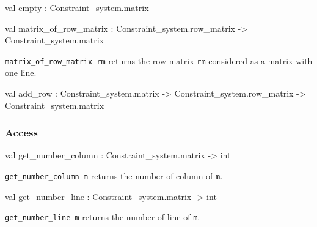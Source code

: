 \begin{ocamldocsigend}


\label{val:Constraint-underscoresystem.Matrix.empty}\begin{ocamldoccode}
val empty : Constraint_system.matrix
\end{ocamldoccode}


\label{val:Constraint-underscoresystem.Matrix.matrix-underscoreof-underscorerow-underscorematrix}\begin{ocamldoccode}
val matrix_of_row_matrix :
  Constraint_system.row_matrix -> Constraint_system.matrix
\end{ocamldoccode}
\begin{ocamldocdescription}
{\tt{matrix\_of\_row\_matrix rm}} returns the row matrix {\tt{rm}} considered as a matrix with one line.


\end{ocamldocdescription}


\label{val:Constraint-underscoresystem.Matrix.add-underscorerow}\begin{ocamldoccode}
val add_row :
  Constraint_system.matrix ->
  Constraint_system.row_matrix -> Constraint_system.matrix
\end{ocamldoccode}


\subsubsection{Access}


\label{val:Constraint-underscoresystem.Matrix.get-underscorenumber-underscorecolumn}\begin{ocamldoccode}
val get_number_column : Constraint_system.matrix -> int
\end{ocamldoccode}
\begin{ocamldocdescription}
{\tt{get\_number\_column m}} returns the number of column of {\tt{m}}.


\end{ocamldocdescription}


\label{val:Constraint-underscoresystem.Matrix.get-underscorenumber-underscoreline}\begin{ocamldoccode}
val get_number_line : Constraint_system.matrix -> int
\end{ocamldoccode}
\begin{ocamldocdescription}
{\tt{get\_number\_line m}} returns the number of line of {\tt{m}}.



\end{ocamldocdescription}
\end{ocamldocsigend}
